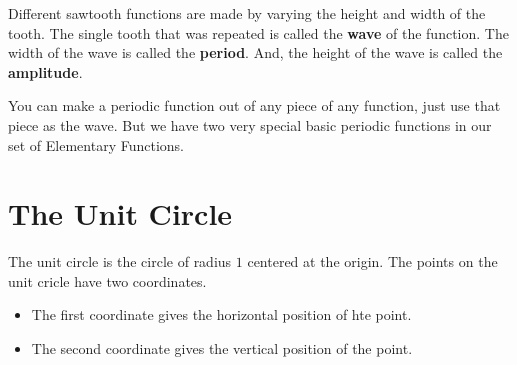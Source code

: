 \documentclass{ximera}
\begin{document}
\begin{example}
\begin{image}
\end{image}


Different sawtooth functions are made by varying the height and width of the tooth.  The single tooth that was repeated is called the \textbf{wave} of the function.  The width of the wave is called the \textbf{period}. And, the height of the wave is called the \textbf{amplitude}.


\end{example}



You can make a periodic function out of any piece of any function, just use that piece as the wave. But we have two very special basic periodic functions in our set of Elementary Functions.






\section{The Unit Circle}


The unit circle is the circle of radius $1$ centered at the origin. The points on the unit cricle have two coordinates.  

\begin{itemize}
\item The first coordinate gives the horizontal position of hte point. 
\item The second coordinate gives the vertical position of the point.  
\end{itemize}
\end{document}
